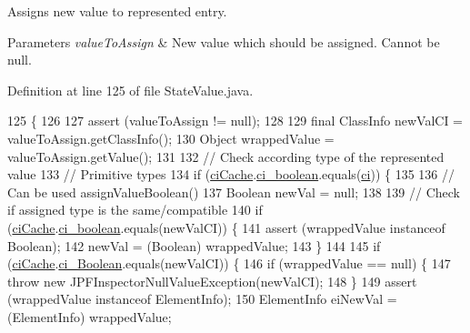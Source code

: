 Assigns new value to represented entry. 


\begin{DoxyParams}{Parameters}
{\em value\+To\+Assign} & New value which should be assigned. Cannot be null. \\
\hline
\end{DoxyParams}


Definition at line 125 of file State\+Value.\+java.


\begin{DoxyCode}
125                                                                                                    \{
126 
127     assert (valueToAssign != null);
128 
129     \textcolor{keyword}{final} ClassInfo newValCI = valueToAssign.getClassInfo();
130     Object wrappedValue = valueToAssign.getValue();
131 
132     \textcolor{comment}{// Check according type of the represented value}
133     \textcolor{comment}{// Primitive types}
134     \textcolor{keywordflow}{if} (\hyperlink{classgov_1_1nasa_1_1jpf_1_1inspector_1_1server_1_1programstate_1_1_state_value_a38182b5018580765f3f2cdc9e96e1ca2}{ciCache}.\hyperlink{classgov_1_1nasa_1_1jpf_1_1inspector_1_1utils_1_1_class_info_cache_a437835d06c0658d7f01e051329a71582}{ci\_boolean}.equals(\hyperlink{classgov_1_1nasa_1_1jpf_1_1inspector_1_1server_1_1programstate_1_1_state_value_a0eb4aa1e630ed6372dcfb8c41ae7edc5}{ci})) \{
135 
136       \textcolor{comment}{// Can be used assignValueBoolean()}
137       Boolean newVal = null;
138 
139       \textcolor{comment}{// Check if assigned type is the same/compatible}
140       \textcolor{keywordflow}{if} (\hyperlink{classgov_1_1nasa_1_1jpf_1_1inspector_1_1server_1_1programstate_1_1_state_value_a38182b5018580765f3f2cdc9e96e1ca2}{ciCache}.\hyperlink{classgov_1_1nasa_1_1jpf_1_1inspector_1_1utils_1_1_class_info_cache_a437835d06c0658d7f01e051329a71582}{ci\_boolean}.equals(newValCI)) \{
141         assert (wrappedValue instanceof Boolean);
142         newVal = (Boolean) wrappedValue;
143       \}
144 
145       \textcolor{keywordflow}{if} (\hyperlink{classgov_1_1nasa_1_1jpf_1_1inspector_1_1server_1_1programstate_1_1_state_value_a38182b5018580765f3f2cdc9e96e1ca2}{ciCache}.\hyperlink{classgov_1_1nasa_1_1jpf_1_1inspector_1_1utils_1_1_class_info_cache_a3566b05065e222a8863f2f435218017e}{ci\_Boolean}.equals(newValCI)) \{
146         \textcolor{keywordflow}{if} (wrappedValue == null) \{
147           \textcolor{keywordflow}{throw} \textcolor{keyword}{new} JPFInspectorNullValueException(newValCI);
148         \}
149         assert (wrappedValue instanceof ElementInfo);
150         ElementInfo eiNewVal = (ElementInfo) wrappedValue;

\end{DoxyCode}

